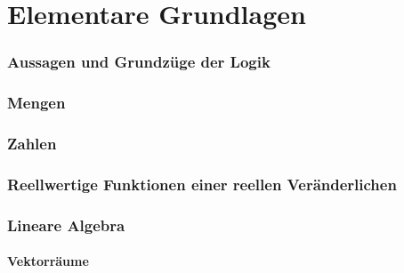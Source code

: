 





\maketitle
\newpage
\tableofcontents
\newpage


\part{Elementare Grundlagen}

\section{Aussagen und Grundzüge der Logik}


\section{Mengen}\label{sec:Mengen}


\section{Zahlen}


\section{Reellwertige Funktionen einer reellen Veränderlichen}


\section{Lineare Algebra}
%
\subsection{Vektorräume}

